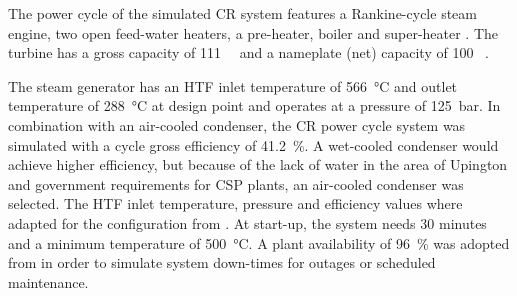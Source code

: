 The power cycle of the simulated CR system features a Rankine-cycle steam engine, two open feed-water heaters, a pre-heater, boiler and super-heater \cite{NREL2015a}. The turbine has a gross capacity of \SI{111}{\mega\wattel} and a nameplate (net) capacity of 100 \si{\mega\wattel}. 


The steam generator has an HTF inlet temperature of \SI{566}{\celsius} and outlet temperature of \SI{288}{\celsius} at design point and operates at a pressure of \SI{125}{\bar}. In combination with an air-cooled condenser, the CR power cycle system was simulated with a cycle gross efficiency of \SI{41.2}{\percent}. A wet-cooled condenser would achieve higher efficiency, but because of the lack of water in the area of Upington and government requirements for CSP plants, an air-cooled condenser was selected. The HTF inlet temperature, pressure and efficiency values where adapted for the configuration from \cite{Kolb2011a}. At start-up, the system needs 30 minutes and a minimum temperature of \SI{500}{\celsius}. A plant availability of \SI{96}{\percent} was adopted from \cite{Morin2012} in order to simulate system down-times for outages or scheduled maintenance.

